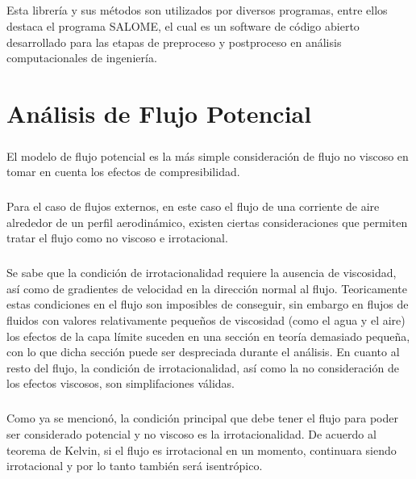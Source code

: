 \documentclass[letterpaper, openright, 12pt]{book}
\begin{document}
    \paragraph*{}
        Esta librería y sus métodos son utilizados por diversos programas, entre
        ellos destaca el programa SALOME, el cual es un software de código
        abierto desarrollado para las etapas de preproceso y postproceso en
        análisis computacionales de ingeniería.



%
%
%
%
%

\chapter{Análisis de Flujo Potencial}
    \paragraph*{}
        El modelo de flujo potencial es la más simple consideración de flujo no viscoso en
        tomar en cuenta los efectos de compresibilidad.

    \paragraph*{}
        Para el caso de flujos externos, en este caso el flujo de una corriente
        de aire alrededor de un perfil aerodinámico, existen ciertas
        consideraciones que permiten tratar el flujo como no viscoso e
        irrotacional.

    \paragraph*{}
        Se sabe que la condición de irrotacionalidad requiere la ausencia de
        viscosidad, así como de gradientes de velocidad en la dirección normal
        al flujo. Teoricamente estas condiciones en el flujo son imposibles de
        conseguir, sin embargo en flujos de fluidos con valores relativamente
        pequeños de viscosidad (como el agua y el aire) los efectos de la capa
        límite suceden en una sección en teoría demasiado pequeña, con lo  que
        dicha sección puede ser despreciada durante el análisis. En cuanto al
        resto del flujo, la condición de irrotacionalidad, así como la no
        consideración de los efectos viscosos, son simplifaciones válidas.

    \paragraph*{}
        Como ya se mencionó, la condición principal que debe tener el flujo
        para poder ser considerado potencial y no viscoso es la
        irrotacionalidad. De acuerdo al teorema de Kelvin, si el flujo es
        irrotacional en un momento, continuara siendo irrotacional y por lo
        tanto también será isentrópico.
\end{document}
